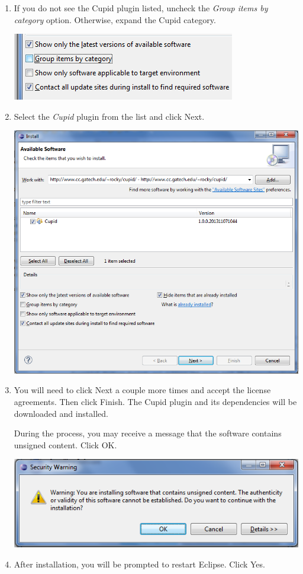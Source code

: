 \documentclass[oneside,11pt]{memoir}
\begin{document}
\begin{enumerate}
\begin{enumerate}
\item If you do not see the Cupid plugin listed, uncheck the \emph{Group items by category} option.  Otherwise, expand the Cupid category.

\parbox{\linewidth}{\centering
  \includegraphics{figs/install_fig3.png}
}

\item Select the \emph{Cupid} plugin from the list and click Next.

\parbox{\linewidth}{\centering
  \includegraphics{figs/install_fig4.png}
}

\item You will need to click Next a couple more times and accept the license agreements. Then click Finish.  The Cupid plugin and its dependencies will be downloaded and installed. 

During the process, you may receive a message that the software contains unsigned content.  Click OK.

\parbox{\linewidth}{\centering
  \includegraphics{figs/install_fig5.png}
}

\item After installation, you will be prompted to restart Eclipse.  Click Yes.

\end{enumerate}
\end{enumerate}
\end{document}
